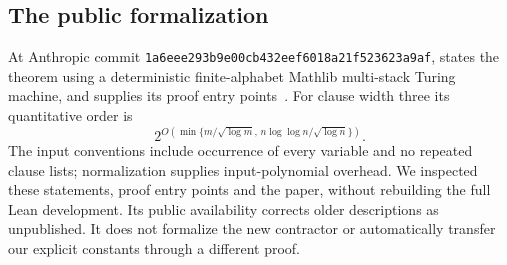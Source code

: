 \documentclass[11pt]{article}
\begin{document}
\subsection{The public formalization}

At Anthropic commit
\texttt{1a6eee293b9e00cb432eef6018a21f523623a9af},
 states the theorem using a deterministic
finite-alphabet Mathlib multi-stack Turing machine, and
 supplies its proof entry points~\cite{anthropic}.
For clause width three its quantitative order is
\[
 2^{O\left(\min\{m/\sqrt{\log m},\,
                    n\log\log n/\sqrt{\log n}\}\right)}.
\]
The input conventions include occurrence of every variable and no repeated
clause lists; normalization supplies input-polynomial overhead. We inspected
these statements, proof entry points and the paper, without rebuilding the
full Lean development. Its public availability corrects older descriptions
as unpublished. It does not formalize the new contractor or automatically
transfer our explicit constants through a different proof.






\appendix


\end{document}
